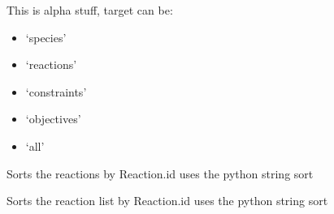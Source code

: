 \documentclass[letterpaper,10pt,english]{sphinxmanual}
\begin{document}
\begin{fulllineitems}
\begin{fulllineitems}
\end{fulllineitems}


\begin{fulllineitems}
\label{\detokenize{modules_doc:cbmpy.CBModel.Model.setSuffix}}
\pysigstartsignatures
{}
\pysigstopsignatures
\sphinxAtStartPar
This is alpha stuff, target can be:
\begin{itemize}
\item {} 
\sphinxAtStartPar
‘species’

\item {} 
\sphinxAtStartPar
‘reactions’

\item {} 
\sphinxAtStartPar
‘constraints’

\item {} 
\sphinxAtStartPar
‘objectives’

\item {} 
\sphinxAtStartPar
‘all’

\end{itemize}

\end{fulllineitems}


\begin{fulllineitems}
\label{\detokenize{modules_doc:cbmpy.CBModel.Model.sortReactionsById}}
\pysigstartsignatures
{}
\pysigstopsignatures
\sphinxAtStartPar
Sorts the reactions by Reaction.id uses the python string sort

\end{fulllineitems}


\begin{fulllineitems}
\label{\detokenize{modules_doc:cbmpy.CBModel.Model.sortSpeciesById}}
\pysigstartsignatures
{}
\pysigstopsignatures
\sphinxAtStartPar
Sorts the reaction list by Reaction.id uses the python string sort


\end{fulllineitems}
\end{fulllineitems}
\end{document}
